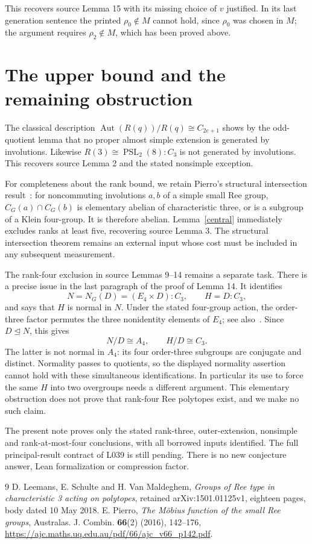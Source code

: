 \documentclass[11pt,a4paper]{article}
\begin{document}
This recovers source Lemma 15 with its missing choice of $v$ justified.
In its last generation sentence the printed $\rho_0\notin M$ cannot
hold, since $\rho_0$ was chosen in $M$; the argument requires
$\rho_2\notin M$, which has been proved above.

\section{The upper bound and the remaining obstruction}
The classical description $\operatorname{Aut}(R(q))/R(q)\cong C_{2e+1}$
shows by the odd-quotient lemma that no proper almost simple extension
is generated by involutions. Likewise $R(3)\cong\operatorname{PSL}_2(8):C_3$
is not generated by involutions. This recovers source Lemma 2 and the
stated nonsimple exception.

For completeness about the rank bound, we retain Pierro's structural
intersection result~\cite[Lemma 3.13, noncommuting case]{Pierro}:
for noncommuting involutions $a,b$ of a simple small Ree group,
$C_G(a)\cap C_G(b)$ is elementary abelian of characteristic three,
or is a subgroup of a Klein four-group. It is therefore abelian.
Lemma~\ref{central} immediately excludes ranks at least five, recovering
source Lemma 3. The structural intersection theorem remains an external
input whose cost must be included in any subsequent measurement.

The rank-four exclusion in source Lemmas 9--14 remains a separate task.
There is a precise issue in the last paragraph of the proof of Lemma 14.
It identifies
\[
 N=N_G(D)=(E_4\times D):C_3,\qquad H=D:C_3,
\]
and says that $H$ is normal in $N$. Under the stated four-group action,
the order-three factor permutes the three nonidentity elements of $E_4$;
see also~\cite[Section 2.2.4]{Pierro}. Since $D\trianglelefteq N$, this gives
\[
 N/D\cong A_4,\qquad H/D\cong C_3.
\]
The latter is not normal in $A_4$: its four order-three subgroups are
conjugate and distinct. Normality passes to quotients, so the displayed
normality assertion cannot hold with these simultaneous identifications.
In particular its use to force the same $H$ into two overgroups needs a
different argument. This elementary obstruction does not prove that
rank-four Ree polytopes exist, and we make no such claim.

The present note proves only the stated rank-three, outer-extension,
nonsimple and rank-at-most-four conclusions, with all borrowed inputs
identified. The full principal-result contract of L039 is still pending.
There is no new conjecture answer, Lean formalization or compression factor.

\begin{thebibliography}{9}
 D. Leemans, E. Schulte and H. Van Maldeghem,
\emph{Groups of Ree type in characteristic 3 acting on polytopes},
retained arXiv:1501.01125v1, eighteen pages, body dated 10 May 2018.
 E. Pierro, \emph{The M\"obius function of the small Ree groups},
Australas. J. Combin. \textbf{66}(2) (2016), 142--176,
\url{https://ajc.maths.uq.edu.au/pdf/66/ajc_v66_p142.pdf}.
\end{thebibliography}
\end{document}
